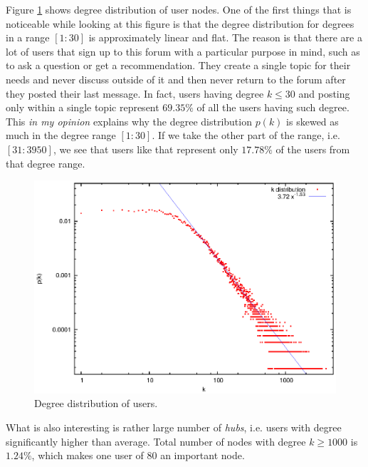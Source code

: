     Figure \ref{fig:degdist_users} shows degree distribution of user nodes. One of the first things that is noticeable while looking at this figure is that the degree distribution for degrees in a range $[1:30]$ is approximately linear and flat. The reason is that there are a lot of users that sign up to this forum with a particular purpose in mind, such as to ask a question or get a recommendation. They create a single topic for their needs and never discuss outside of it and then never return to the forum after they posted their last message. In fact, users having degree $k \leq 30$ and posting only within a single topic represent $69.35\%$ of all the users having such degree. This \emph{in my opinion} explains why the degree distribution $p(k)$ is skewed as much in the degree range $[1:30]$. If we take the other part of the range, i.e. $[31:3950]$, we see that users like that represent only $17.78\%$ of the users from that degree range.
    \begin{figure}[H]
      \centering
      \includegraphics[width=\textwidth]{chapters/03_implementation/degdist_users}
      \caption{Degree distribution of users.}
      \label{fig:degdist_users}
    \end{figure}
    What is also interesting is rather large number of \emph{hubs}, i.e. users with degree significantly higher than average. Total number of nodes with degree $k \geq 1000$ is $1.24\%$, which makes one user of 80 an important node.
    
